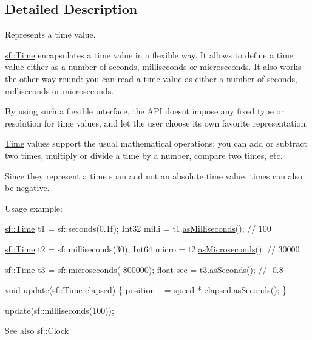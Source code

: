 \subsection{Detailed Description}
Represents a time value. 

\hyperlink{classsf_1_1_time}{sf\+::\+Time} encapsulates a time value in a flexible way. It allows to define a time value either as a number of seconds, milliseconds or microseconds. It also works the other way round\+: you can read a time value as either a number of seconds, milliseconds or microseconds.

By using such a flexible interface, the A\+PI doesn\textquotesingle{}t impose any fixed type or resolution for time values, and let the user choose its own favorite representation.

\hyperlink{classsf_1_1_time}{Time} values support the usual mathematical operations\+: you can add or subtract two times, multiply or divide a time by a number, compare two times, etc.

Since they represent a time span and not an absolute time value, times can also be negative.

Usage example\+: 
\begin{DoxyCode}
\hyperlink{classsf_1_1_time}{sf::Time} t1 = sf::seconds(0.1f);
Int32 milli = t1.\hyperlink{classsf_1_1_time_aa16858ca030a07eb18958c321f256e5a}{asMilliseconds}(); \textcolor{comment}{// 100}

\hyperlink{classsf_1_1_time}{sf::Time} t2 = sf::milliseconds(30);
Int64 micro = t2.\hyperlink{classsf_1_1_time_a000c2c64b74658ebd228b9294a464275}{asMicroseconds}(); \textcolor{comment}{// 30000}

\hyperlink{classsf_1_1_time}{sf::Time} t3 = sf::microseconds(-800000);
\textcolor{keywordtype}{float} sec = t3.\hyperlink{classsf_1_1_time_aa3df2f992d0b0041b4eb02258d43f0e3}{asSeconds}(); \textcolor{comment}{// -0.8}
\end{DoxyCode}



\begin{DoxyCode}
\textcolor{keywordtype}{void} update(\hyperlink{classsf_1_1_time}{sf::Time} elapsed)
\{
   position += speed * elapsed.\hyperlink{classsf_1_1_time_aa3df2f992d0b0041b4eb02258d43f0e3}{asSeconds}();
\}

update(sf::milliseconds(100));
\end{DoxyCode}


\begin{DoxySeeAlso}{See also}
\hyperlink{classsf_1_1_clock}{sf\+::\+Clock} 
\end{DoxySeeAlso}


